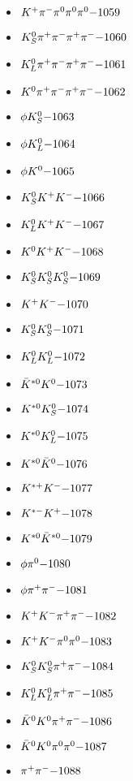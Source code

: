 \begin{multicols}{3}
\begin{itemize}
 \item $ K^{+} \pi^{-} \pi^{0} \pi^{0} \pi^{0} \hfill{-1059}$
 \item $ K_{S}^{0} \pi^{+} \pi^{-} \pi^{+} \pi^{-} \hfill{-1060}$
 \item $ K_{L}^{0} \pi^{+} \pi^{-} \pi^{+} \pi^{-} \hfill{-1061}$
 \item $ K^{0} \pi^{+} \pi^{-} \pi^{+} \pi^{-} \hfill{-1062}$
 \item $ \phi K_{S}^{0} \hfill{-1063}$
 \item $ \phi K_{L}^{0} \hfill{-1064}$
 \item $ \phi K^{0} \hfill{-1065}$
 \item $ K_{S}^{0} K^{+} K^{-} \hfill{-1066}$
 \item $ K_{L}^{0} K^{+} K^{-} \hfill{-1067}$
 \item $ K^{0} K^{+} K^{-} \hfill{-1068}$
 \item $ K_{S}^{0} K_{S}^{0} K_{S}^{0} \hfill{-1069}$
 \item $ K^{+} K^{-} \hfill{-1070}$
 \item $ K_{S}^{0} K_{S}^{0} \hfill{-1071}$
 \item $ K_{L}^{0} K_{L}^{0} \hfill{-1072}$
 \item $ \bar{K}^{*0} K^{0} \hfill{-1073}$
 \item $ K^{*0} K_{S}^{0} \hfill{-1074}$
 \item $ K^{*0} K_{L}^{0} \hfill{-1075}$
 \item $ K^{*0} \bar{K}^{0} \hfill{-1076}$
 \item $ K^{*+} K^{-} \hfill{-1077}$
 \item $ K^{*-} K^{+} \hfill{-1078}$
 \item $ K^{*0} \bar{K}^{*0} \hfill{-1079}$
 \item $ \phi \pi^{0} \hfill{-1080}$
 \item $ \phi \pi^{+} \pi^{-} \hfill{-1081}$
 \item $ K^{+} K^{-} \pi^{+} \pi^{-} \hfill{-1082}$
 \item $ K^{+} K^{-} \pi^{0} \pi^{0} \hfill{-1083}$
 \item $ K_{S}^{0} K_{S}^{0} \pi^{+} \pi^{-} \hfill{-1084}$
 \item $ K_{L}^{0} K_{L}^{0} \pi^{+} \pi^{-} \hfill{-1085}$
 \item $ \bar{K}^{0} K^{0} \pi^{+} \pi^{-} \hfill{-1086}$
 \item $ \bar{K}^{0} K^{0} \pi^{0} \pi^{0} \hfill{-1087}$
 \item $ \pi^{+} \pi^{-} \hfill{-1088}$

\end{itemize}
\end{multicols}
